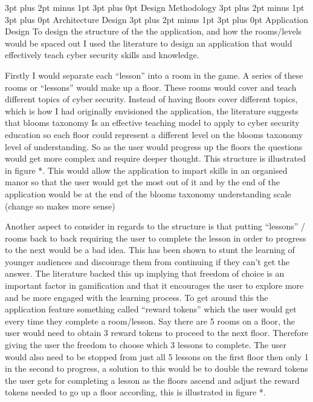 \documentclass[12pt,a4paper]{article}
\makeatletter
\renewcommand\subsection{\@startsection {subsection}{1}{2mm} %
                               {3pt plus 2pt minus 1pt} %
                               {3pt plus 0pt} %
                               {\normalfont\bfseries}}
\makeatother
\begin{document}
\subsection{Design Methodology} 
\subsection{Architecture Design} 
\subsection{Application Design}  
To design the structure of the the application, and how the rooms/levels would be spaced out I used the literature to design an application that would effectively teach cyber security skills and knowledge. 

Firstly I would separate each “lesson” into a room in the game. A series of these rooms or “lessons” would make up a floor. These rooms would cover and teach different topics of cyber security. Instead of having floors cover different topics, which is how I had originally envisioned the application, the literature suggests that blooms taxonomy Is an effective teaching model to apply to cyber security education so each floor could represent a different level on the blooms taxonomy level of understanding. So as the user would progress up the floors the questions would get more complex and require deeper thought. This structure is illustrated in figure *.  This would allow the application to impart skills in an organised manor so that the user would get the most out of it and by the end of the application would be at the end of the blooms taxonomy understanding scale (change so makes more sense)


Another aspect to consider in regards to the structure is that putting “lessons” / rooms back to back requiring the user to complete the lesson in order to progress to the next would be a bad idea. This has been shown to stunt the learning of younger audiences and discourage them from continuing if they can’t get the answer. The literature backed this up implying that freedom of choice is an important factor in gamification and that it encourages the user to explore more and be more engaged with the learning process. To get around this the application feature something called “reward tokens” which the user would get every time they complete a room/lesson. Say there are 5 rooms on a floor, the user would need to obtain 3 reward tokens to proceed to the next floor. Therefore giving the user the freedom to choose which 3 lessons to complete. The user would also need to be stopped from just all 5 lessons on the first floor then only 1 in the second to progress, a solution to this would be to double the reward tokens the user gets for completing a lesson as the floors ascend and adjust the reward tokens needed to go up a floor according, this is illustrated in figure *. 
\end{document}
